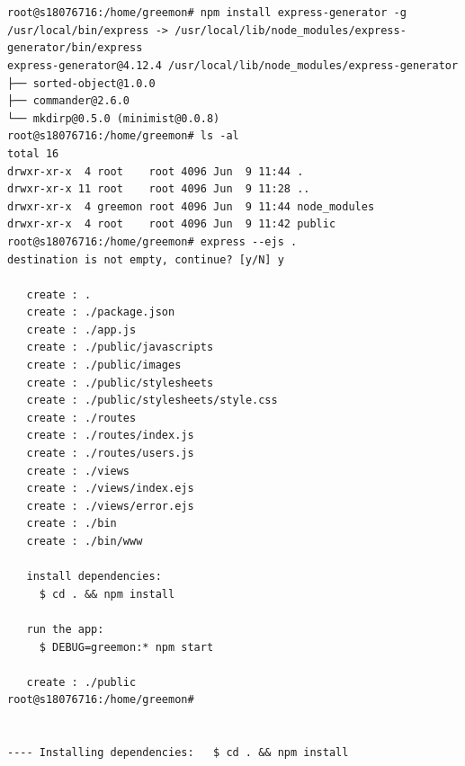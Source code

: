 \documentclass[pointlessnumbers]{scrartcl}
\begin{document}
\begin{lstlisting}


root@s18076716:/home/greemon# npm install express-generator -g
/usr/local/bin/express -> /usr/local/lib/node_modules/express-generator/bin/express
express-generator@4.12.4 /usr/local/lib/node_modules/express-generator
├── sorted-object@1.0.0
├── commander@2.6.0
└── mkdirp@0.5.0 (minimist@0.0.8)
root@s18076716:/home/greemon# ls -al 
total 16
drwxr-xr-x  4 root    root 4096 Jun  9 11:44 .
drwxr-xr-x 11 root    root 4096 Jun  9 11:28 ..
drwxr-xr-x  4 greemon root 4096 Jun  9 11:44 node_modules
drwxr-xr-x  4 root    root 4096 Jun  9 11:42 public
root@s18076716:/home/greemon# express --ejs .
destination is not empty, continue? [y/N] y

   create : .
   create : ./package.json
   create : ./app.js
   create : ./public/javascripts
   create : ./public/images
   create : ./public/stylesheets
   create : ./public/stylesheets/style.css
   create : ./routes
   create : ./routes/index.js
   create : ./routes/users.js
   create : ./views
   create : ./views/index.ejs
   create : ./views/error.ejs
   create : ./bin
   create : ./bin/www

   install dependencies:
     $ cd . && npm install

   run the app:
     $ DEBUG=greemon:* npm start

   create : ./public
root@s18076716:/home/greemon# 


---- Installing dependencies:   $ cd . && npm install



\end{lstlisting}






\end{document}
